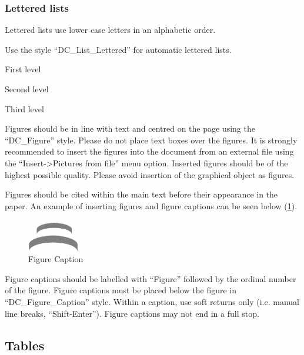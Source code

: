 \documentclass{design}
\begin{document}
\subsubsection{Lettered lists}

\begin{letterlist}
    \item Lettered lists use lower case letters in an alphabetic order.
    \item Use the style “DC\_List\_Lettered” for automatic lettered lists.
    \item First level
    \begin{letterlist}
        \item Second level
        \begin{letterlist}
            \item Third level
        \end{letterlist}
    \end{letterlist}
\end{letterlist}

Figures should be in line with text and centred on the page using the “DC\_Figure” style. Please do not place text boxes over the figures. It is strongly recommended to insert the figures into the document from an external file using the “Insert->Pictures from file” menu option. Inserted figures should be of the highest possible quality. Please avoid insertion of the graphical object as figures.

Figures should be cited within the main text before their appearance in the paper. An example of inserting figures and figure captions can be seen below (\cref{fig:one}).

\begin{figure}[h]
    \centering
    \includegraphics[width=0.2\textwidth]{design-logo.png}
    \caption{Figure Caption}
    \label{fig:one}
\end{figure}

Figure captions should be labelled with “Figure” followed by the ordinal number of the figure. Figure captions must be placed below the figure in “DC\_Figure\_Caption” style. Within a caption, use soft returns only (i.e. manual line breaks, “Shift-Enter”). Figure captions may not end in a full stop.

\subsection{Tables}
\end{document}

